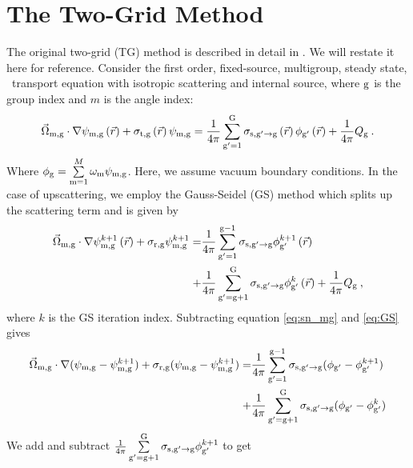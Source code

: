 \section{The Two-Grid Method}
The original two-grid (TG) method is described in detail in \cite{morel-upscat}. We will restate it here for reference. Consider the first order, fixed-source, multigroup, steady state, \sn\ transport equation with isotropic scattering and internal source, where $\mathrm{g}$ is the group index and $m$ is the angle index:
  \begin{equation}
  \vec{\Omega}_{\mathrm{m},\mathrm{g}}\cdot \nabla \psi_{\mathrm{m},\mathrm{g}} \left(\vec{r}\right)+ \sigma_{\mathrm{t},\mathrm{g}}\left(\vec{r}\right)\psi_{\mathrm{m},\mathrm{g}} = \frac{1}{4 \pi} \sum\limits_{\mathrm{g}'=1}^{\mathrm{G}} \sigma_{\mathrm{s},{\mathrm{g}'}\to\mathrm{g}}\left(\vec{r}\right) \phi_{\mathrm{g}'}\left(\vec{r}\right) + \frac{1}{4 \pi} Q_{\mathrm{g}}\:.
  \label{eq:sn_mg}
  \end{equation}
  Where $\phi_{\mathrm{g}} = \sum\limits_{\mathrm{m}=1}^M \omega_{\mathrm{m}} \psi_{\mathrm{m}, \mathrm{g}}$. Here, we assume vacuum boundary conditions. In the case of upscattering, we employ the Gauss-Seidel (GS) method which splits up the scattering term and is given by 
  \begin{equation}
  \begin{split}
  \vec{\Omega}_{\mathrm{m},\mathrm{g}}\cdot \nabla \psi^{k+1}_{\mathrm{m},\mathrm{g}} \left(\vec{r}\right) + \sigma_{\mathrm{r},\mathrm{g}}\psi^{k+1}_{\mathrm{m},\mathrm{g}} = &\frac{1}{4 \pi} \sum\limits_{\mathrm{g}'=1}^{\mathrm{\mathrm{g}-1}} \sigma_{\mathrm{s},{\mathrm{g}'}\to\mathrm{g}} \phi^{k+1}_{\mathrm{g}'}\left(\vec{r}\right)  \\ +  &\frac{1}{4 \pi} \sum\limits_{\mathrm{g}'=\mathrm{g}+1}^{\mathrm{G}} \sigma_{\mathrm{s},{\mathrm{g}'}\to\mathrm{g}} \phi^{k}_{\mathrm{g}'}\left(\vec{r}\right) + \frac{1}{4 \pi} Q_{\mathrm{g}}\:,
  \end{split}
  \label{eq:GS}
  \end{equation}
  where $k$ is the GS iteration index. Subtracting equation \ref{eq:sn_mg} and \ref{eq:GS} gives
  \begin{equation}
    \begin{split}
      \vec{\Omega}_{\mathrm{m},\mathrm{g}} \cdot \nabla(\psi_{\mathrm{m}, \mathrm{g}} - \psi^{k+1}_{\mathrm{m}, \mathrm{g}}) + \sigma_{\mathrm{r}, \mathrm{g}}(\psi_{\mathrm{m}, \mathrm{g}} - \psi^{k+1}_{\mathrm{m}, \mathrm{g}}) = &\frac{1}{4 \pi} \sum\limits_{\mathrm{g}'= 1}^{\mathrm{\mathrm{g}-1}} \sigma_{\mathrm{s},{\mathrm{g}'}\to\mathrm{g}} ( \phi _{\mathrm{g}'} - \phi^{k+1}_{\mathrm{g}'} ) \\  + &\frac{1}{4 \pi} \sum\limits_{\mathrm{g}'=\mathrm{g}+1}^{\mathrm{G}} \sigma_{\mathrm{s},{\mathrm{g}'}\to\mathrm{g}} (\phi_{\mathrm{g}'} - \phi^{k}_{\mathrm{g}'} ) 
    \end{split}
  \end{equation}
  We add and subtract $\frac{1}{4 \pi} \sum\limits_{\mathrm{g}'=\mathrm{g}+1}^{\mathrm{G}} \sigma_{\mathrm{s},{\mathrm{g}'}\to\mathrm{g}} \phi^{k+1}_{\mathrm{g}'}$ to get 
